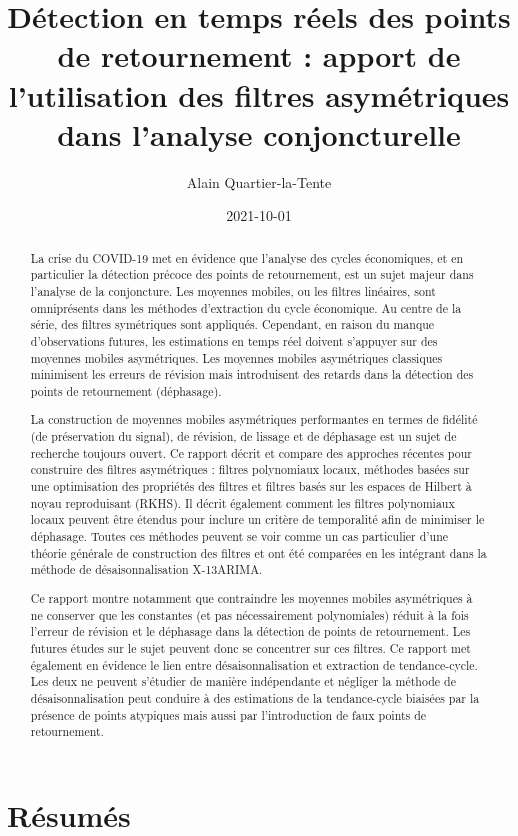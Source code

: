 \documentclass[
  11pt,
  french,
  a4paper]{article}
\title{Détection en temps réels des points de retournement : apport de l'utilisation des filtres asymétriques dans l'analyse conjoncturelle}
\author{Alain Quartier-la-Tente}
\date{2021-10-01}
\newcommand\1{\mathds{1}}
\begin{document}
\maketitle

{
\hypersetup{linkcolor=}
\setcounter{tocdepth}{3}
\tableofcontents
}
\newpage{}

\hypertarget{ruxe9sumuxe9s}{%
\section*{Résumés}\label{ruxe9sumuxe9s}}

\begin{abstract}
La crise du COVID-19 met en évidence que l'analyse des cycles économiques, et en particulier la détection précoce des points de retournement, est un sujet majeur dans l'analyse de la conjoncture.
Les moyennes mobiles, ou les filtres linéaires, sont omniprésents dans les méthodes d'extraction du cycle économique.
Au centre de la série, des filtres symétriques sont appliqués.
Cependant, en raison du manque d'observations futures, les estimations en temps réel doivent s'appuyer sur des moyennes mobiles asymétriques.
Les moyennes mobiles asymétriques classiques minimisent les erreurs de révision mais introduisent des retards dans la détection des points de retournement (déphasage).

La construction de moyennes mobiles asymétriques performantes en termes de fidélité (de préservation du signal), de révision, de lissage et de déphasage est un sujet de recherche toujours ouvert.
Ce rapport décrit et compare des approches récentes pour construire des filtres asymétriques : filtres polynomiaux locaux, méthodes basées sur une optimisation des propriétés des filtres et filtres basés sur les espaces de Hilbert à noyau reproduisant (RKHS).
Il décrit également comment les filtres polynomiaux locaux peuvent être étendus pour inclure un critère de temporalité afin de minimiser le déphasage.
Toutes ces méthodes peuvent se voir comme un cas particulier d'une théorie générale de construction des filtres et ont été comparées en les intégrant dans la méthode de désaisonnalisation X-13ARIMA.

Ce rapport montre notamment que contraindre les moyennes mobiles asymétriques à ne conserver que les constantes (et pas nécessairement polynomiales) réduit à la fois l'erreur de révision et le déphasage dans la détection de points de retournement.
Les futures études sur le sujet peuvent donc se concentrer sur ces filtres.
Ce rapport met également en évidence le lien entre désaisonnalisation et extraction de tendance-cycle.
Les deux ne peuvent s'étudier de manière indépendante et négliger la méthode de désaisonnalisation peut conduire à des estimations de la tendance-cycle biaisées par la présence de points atypiques mais aussi par l'introduction de faux points de retournement.


\end{abstract}
\end{document}
